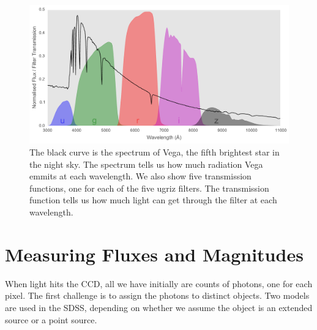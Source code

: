 \begin{figure}[tbp]
	\centering
	\includegraphics[width=\textwidth]{figures/vega_filters_and_spectrum}
	\caption[The spectrum of the star Vega and the ugriz bandpasses]{The black curve
		is the spectrum of Vega, the fifth brightest star in the night sky. The spectrum
		tells us how much radiation Vega emmits at each wavelength. We also show five
		transmission functions, one for each of the five ugriz filters. The transmission
		function tells us how much light can get through the filter at each wavelength.}
	\label{fig:vega} 
\end{figure}


\section{Measuring Fluxes and Magnitudes}
\label{sec:mag}
When light hits the CCD, all we have initially are counts of photons, one for each pixel.
The first challenge is to assign the photons to distinct objects. Two models are used
in the SDSS, depending on whether we assume the object is an extended source or a point source.


